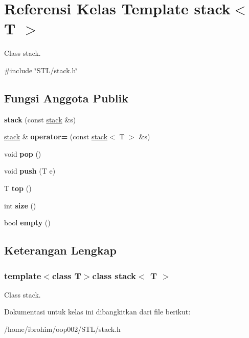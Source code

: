 \hypertarget{classstack}{}\section{Referensi Kelas Template stack$<$ T $>$}
\label{classstack}


Class stack.  




{\ttfamily \#include \char`\"{}S\+T\+L/stack.\+h\char`\"{}}

\subsection*{Fungsi Anggota Publik}
\begin{DoxyCompactItemize}
\item 
\hypertarget{classstack_aa2b7837e7fa4708c17c0a78520d18924}{}{\bfseries stack} (const \hyperlink{classstack}{stack} \&s)\label{classstack_aa2b7837e7fa4708c17c0a78520d18924}

\item 
\hypertarget{classstack_a6c35161825c5a23462f4830a047823bc}{}\hyperlink{classstack}{stack} \& {\bfseries operator=} (const \hyperlink{classstack}{stack}$<$ T $>$ \&s)\label{classstack_a6c35161825c5a23462f4830a047823bc}

\item 
\hypertarget{classstack_ad6615a82d944ce2e9a9c260b1d126666}{}void {\bfseries pop} ()\label{classstack_ad6615a82d944ce2e9a9c260b1d126666}

\item 
\hypertarget{classstack_a532ce58222bf37610dbf90c37b42ba98}{}void {\bfseries push} (T e)\label{classstack_a532ce58222bf37610dbf90c37b42ba98}

\item 
\hypertarget{classstack_a6093fd7036685b3d9ea89e96609465ac}{}T {\bfseries top} ()\label{classstack_a6093fd7036685b3d9ea89e96609465ac}

\item 
\hypertarget{classstack_a1577ac10f88c5d6bdbbd9f8f61344b91}{}int {\bfseries size} ()\label{classstack_a1577ac10f88c5d6bdbbd9f8f61344b91}

\item 
\hypertarget{classstack_ab82d4f94c3a83318499848de576feede}{}bool {\bfseries empty} ()\label{classstack_ab82d4f94c3a83318499848de576feede}

\end{DoxyCompactItemize}


\subsection{Keterangan Lengkap}
\subsubsection*{template$<$class T$>$class stack$<$ T $>$}

Class stack. 

Dokumentasi untuk kelas ini dibangkitkan dari file berikut\+:\begin{DoxyCompactItemize}
\item 
/home/ibrohim/oop002/\+S\+T\+L/stack.\+h\end{DoxyCompactItemize}
